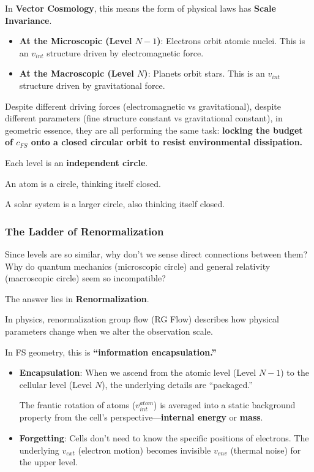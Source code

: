 In \textbf{Vector Cosmology}, this means the form of physical laws has \textbf{Scale Invariance}.

\begin{itemize}
\item \textbf{At the Microscopic (Level $N-1$)}: Electrons orbit atomic nuclei. This is an $v_{int}$ structure driven by electromagnetic force.

\item \textbf{At the Macroscopic (Level $N$)}: Planets orbit stars. This is an $v_{int}$ structure driven by gravitational force.
\end{itemize}

Despite different driving forces (electromagnetic vs gravitational), despite different parameters (fine structure constant vs gravitational constant), in geometric essence, they are all performing the same task: \textbf{locking the budget of $c_{FS}$ onto a closed circular orbit to resist environmental dissipation.}

Each level is an \textbf{independent circle}.

An atom is a circle, thinking itself closed.

A solar system is a larger circle, also thinking itself closed.

\subsubsection{The Ladder of Renormalization}

Since levels are so similar, why don't we sense direct connections between them? Why do quantum mechanics (microscopic circle) and general relativity (macroscopic circle) seem so incompatible?

The answer lies in \textbf{Renormalization}.

In physics, renormalization group flow (RG Flow) describes how physical parameters change when we alter the observation scale.

In FS geometry, this is \textbf{``information encapsulation.''}

\begin{itemize}
\item \textbf{Encapsulation}: When we ascend from the atomic level (Level $N-1$) to the cellular level (Level $N$), the underlying details are ``packaged.''

    The frantic rotation of atoms ($v_{int}^{atom}$) is averaged into a static background property from the cell's perspective---\textbf{internal energy} or \textbf{mass}.

\item \textbf{Forgetting}: Cells don't need to know the specific positions of electrons. The underlying $v_{ext}$ (electron motion) becomes invisible $v_{env}$ (thermal noise) for the upper level.
\end{itemize}

